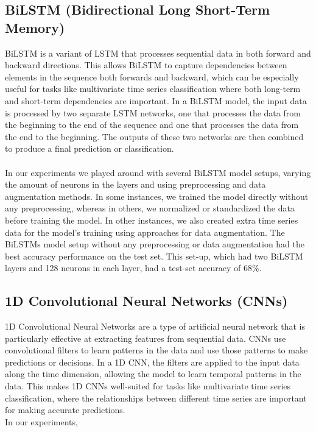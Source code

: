 \documentclass[11pt, oneside]{article}
\begin{document}
\subsection{BiLSTM (Bidirectional Long Short-Term Memory)}
BiLSTM is a variant of LSTM that processes sequential data in both forward and backward directions. This allows BiLSTM to capture dependencies between elements in the sequence both forwards and backward, which can be especially useful for tasks like multivariate time series classification where both long-term and short-term dependencies are important. In a BiLSTM model, the input data is processed by two separate LSTM networks, one that processes the data from the beginning to the end of the sequence and one that processes the data from the end to the beginning. The outputs of these two networks are then combined to produce a final prediction or classification.\\\\
In our experiments we played around with several BiLSTM model setups, varying the amount of neurons in the layers and using preprocessing and data augmentation methods. In some instances, we trained the model directly without any preprocessing, whereas in others, we normalized or standardized the data before training the model. In other instances, we also created extra time series data for the model's training using approaches for data augmentation.
The BiLSTMs model setup without any preprocessing or data augmentation had the best accuracy performance on the test set. This set-up, which had two BiLSTM layers and 128 neurons in each layer, had a test-set accuracy of 68\%.

\subsection{1D Convolutional Neural Networks (CNNs)}
1D Convolutional Neural Networks are a type of artificial neural network that is particularly effective at extracting features from sequential data. CNNs use convolutional filters to learn patterns in the data and use those patterns to make predictions or decisions. In a 1D CNN, the filters are applied to the input data along the time dimension, allowing the model to learn temporal patterns in the data. This makes 1D CNNs well-suited for tasks like multivariate time series classification, where the relationships between different time series are important for making accurate predictions.\\
In our experiments, 
\end{document}
